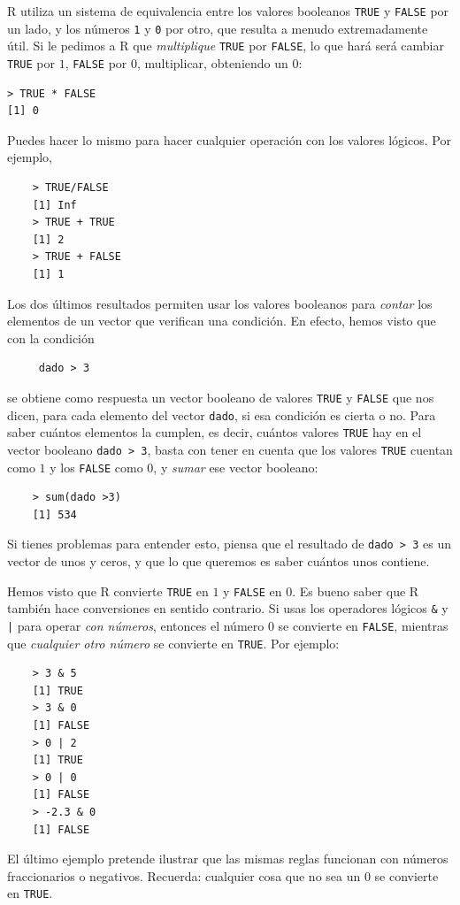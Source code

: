 \documentclass[10pt,a4paper]{article}\usepackage[]{graphicx}\usepackage[]{color}
\newcounter {cont01}
\begin{document}
R utiliza un sistema de equivalencia entre los valores booleanos {\tt TRUE} y {\tt FALSE} por un lado, y los números {\tt 1} y {\tt 0} por otro, que resulta a menudo extremadamente útil. Si le pedimos a R que {\em multiplique} {\tt TRUE} por {\tt FALSE}, lo que hará será cambiar {\tt TRUE} por $1$, {\tt FALSE} por $0$, multiplicar, obteniendo un $0$:
\begin{verbatim}
> TRUE * FALSE
[1] 0
\end{verbatim}
Puedes hacer lo mismo para hacer cualquier operación con los valores lógicos. Por ejemplo,
\begin{verbatim}
    > TRUE/FALSE
    [1] Inf
    > TRUE + TRUE
    [1] 2
    > TRUE + FALSE
    [1] 1
\end{verbatim}
Los dos últimos resultados permiten usar los valores booleanos para {\em contar} los elementos de un vector que verifican una condición. En efecto, hemos visto que con la condición
\begin{verbatim}
     dado > 3
\end{verbatim}
se obtiene como respuesta un vector booleano de valores {\tt TRUE} y {\tt FALSE} que nos dicen, para cada elemento del vector {\tt dado}, si esa condición es cierta o no. Para saber cuántos elementos la cumplen, es decir, cuántos valores {\tt TRUE} hay en el vector booleano {\tt dado > 3}, basta con tener en cuenta que los valores {\tt TRUE} cuentan como $1$ y los {\tt FALSE} como $0$, y {\em sumar} ese vector booleano:
\begin{verbatim}
    > sum(dado >3)
    [1] 534
\end{verbatim}
Si tienes problemas para entender esto, piensa que el resultado de {\tt dado > 3} es un vector de unos y ceros, y que lo que queremos es saber cuántos unos contiene.

Hemos visto que R convierte {\tt TRUE} en $1$ y {\tt FALSE} en $0$. Es bueno saber que R también hace conversiones en sentido contrario. Si usas los operadores lógicos {\tt \&} y {\tt |} para operar {\em con números}, entonces el número $0$ se convierte en {\tt FALSE}, mientras que {\em cualquier otro número} se convierte en {\tt TRUE}. Por ejemplo:
\begin{verbatim}
    > 3 & 5
    [1] TRUE
    > 3 & 0
    [1] FALSE
    > 0 | 2
    [1] TRUE
    > 0 | 0
    [1] FALSE
    > -2.3 & 0
    [1] FALSE
\end{verbatim}
El último ejemplo pretende ilustrar que las mismas reglas funcionan con números fraccionarios o negativos. Recuerda: cualquier cosa que no sea un $0$ se convierte en {\tt TRUE}.
\end{document}
